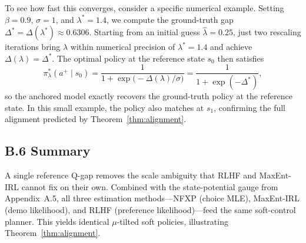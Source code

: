 To see how fast this converges, consider a specific numerical example. Setting $\beta=0.9$, $\sigma=1$, and $\lambda^{\ast}=1.4$, we compute the ground-truth gap $\Delta^{\ast}=\Delta(\lambda^{\ast})\approx 0.6306$.
Starting from an initial guess $\hat\lambda=0.25$, just two rescaling iterations bring $\lambda$ within numerical precision of $\lambda^{\ast}=1.4$ and achieve $\Delta(\lambda)=\Delta^{\ast}$. The optimal policy at the reference state $s_0$ then satisfies
\[
\pi^{\ast}_{\lambda}(a^+\!\mid s_0)
=\frac{1}{1+\exp\!\big(-\Delta(\lambda)/\sigma\big)}
=\frac{1}{1+\exp(-\Delta^{\ast})},
\]
so the anchored model exactly recovers the ground-truth policy at the reference state. In this small example, the policy also matches at $s_1$, confirming the full alignment predicted by Theorem~\ref{thm:alignment}.

\subsection*{B.6 Summary}
A single reference Q-gap removes the scale ambiguity that RLHF and MaxEnt-IRL cannot fix on their own. Combined with the state-potential gauge from Appendix~A.5, all three estimation methods---NFXP (choice MLE), MaxEnt-IRL (demo likelihood), and RLHF (preference likelihood)---feed the same soft-control planner. This yields identical $\mu$-tilted soft policies, illustrating Theorem~\ref{thm:alignment}.
